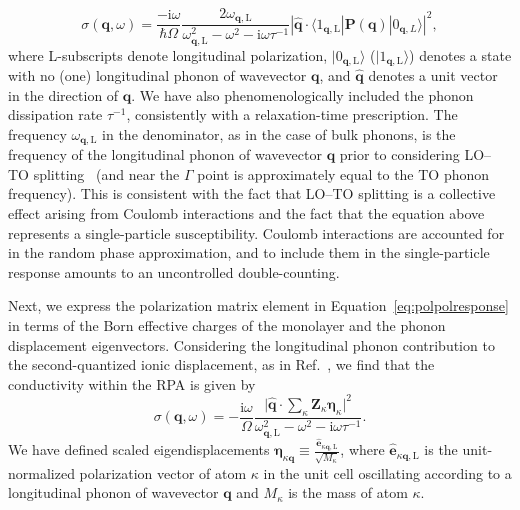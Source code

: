 \documentclass[aps,prb,twocolumn,
	           groupedaddress,superscriptaddress,
               amsfonts,amssymb,amsmath,floatfix,
	           citeautoscript]{revtex4-1}
\newcommand{\iu}{\mathrm{i}}
\begin{document}
\begin{equation}
    \sigma(\mathbf{q},\omega) = \frac{-\iu\omega}{\hbar\Omega} \frac{2\omega_{\mathbf{q},\mathrm{L}}}{\omega^2_{\mathbf{q},\mathrm{L}}-\omega^2-\iu\omega\tau^{-1}}|\hat{\mathbf{q}}\cdot\langle 1_{\mathbf{q},\mathrm{L}}|\mathbf{P}(\mathbf{q})|0_{\mathbf{q},L}\rangle|^2,
    \label{eq:polpolresponse}
\end{equation}
where L-subscripts denote longitudinal polarization, $|0_{\mathbf{q},\mathrm{L}}\rangle$ ($|1_{\mathbf{q},\mathrm{L}}\rangle$) denotes a state with no (one) longitudinal phonon of wavevector $\mathbf{q}$, and $\hat{\mathbf{q}}$ denotes a unit vector in the direction of $\mathbf{q}$. We have also phenomenologically included the phonon dissipation rate $\tau^{-1}$, consistently with  a relaxation-time prescription.  The frequency $\omega_{\mathbf{q},\mathrm{L}}$ in the denominator, as in the case of bulk phonons, is the frequency of the longitudinal phonon of wavevector $\mathbf{q}$ prior to considering LO--TO splitting~\cite{BornHuang:1954} (and near the $\Gamma$ point is approximately equal to the TO phonon frequency). This is consistent with the fact that LO--TO splitting is a collective effect arising from Coulomb interactions and the fact that the equation above represents a single-particle susceptibility. Coulomb interactions are accounted for in the random phase approximation, and to include them in the single-particle response amounts to an uncontrolled double-counting. 

Next, we express the polarization matrix element in Equation~\eqref{eq:polpolresponse} in terms of the Born effective charges of the monolayer and the phonon displacement eigenvectors. Considering the longitudinal phonon contribution to the second-quantized ionic displacement, as in Ref.~, we find that the conductivity within the RPA is given by
\begin{equation}
    \sigma(\mathbf{q},\omega) = -\frac{\iu\omega }{\Omega}\frac{\Big|\hat{\mathbf{q}}\cdot\sum\limits_{\kappa}\mathbf{Z}_{\kappa}\boldsymbol{\eta}_{\kappa} \Big|^2}{\omega^2_{\mathbf{q},\mathrm{L}}-\omega^2-\iu\omega\tau^{-1}}.
    \label{eq:conductivity_simplified}
\end{equation} 
We have defined scaled eigendisplacements $\boldsymbol{\eta}_{\kappa\mathbf{q}}\equiv \frac{\hat{\mathbf{e}}_{\kappa\mathbf{q},\mathrm{L}}}{\sqrt{M_{\kappa}}}$, where $\hat{\mathbf{e}}_{\kappa\mathbf{q},\mathrm{L}}$ is the unit-normalized polarization vector of atom $\kappa$ in the unit cell oscillating according to a longitudinal phonon of wavevector $\mathbf{q}$ and $M_{\kappa}$ is the mass of atom $\kappa$. 
\end{document}
